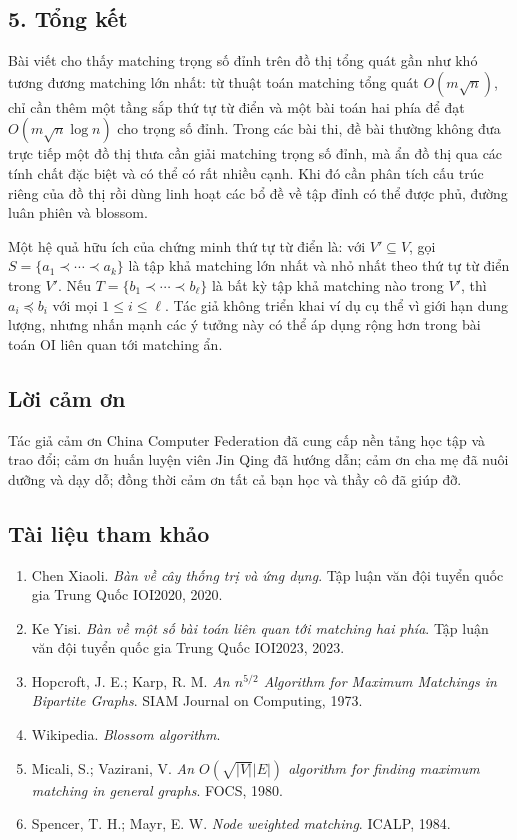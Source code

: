 \documentclass[11pt]{article}
\begin{document}
\subsection*{5. Tổng kết}

Bài viết cho thấy matching trọng số đỉnh trên đồ thị tổng quát gần như khó
tương đương matching lớn nhất: từ thuật toán matching tổng quát
\(O(m\sqrt n)\), chỉ cần thêm một tầng sắp thứ tự từ điển và một bài toán hai
phía để đạt \(O(m\sqrt n\log n)\) cho trọng số đỉnh. Trong các bài thi, đề bài
thường không đưa trực tiếp một đồ thị thưa cần giải matching trọng số đỉnh, mà
ẩn đồ thị qua các tính chất đặc biệt và có thể có rất nhiều cạnh. Khi đó cần
phân tích cấu trúc riêng của đồ thị rồi dùng linh hoạt các bổ đề về tập đỉnh
có thể được phủ, đường luân phiên và blossom.

Một hệ quả hữu ích của chứng minh thứ tự từ điển là: với \(V'\subseteq V\),
gọi \(S=\{a_1\prec\cdots\prec a_k\}\) là tập khả matching lớn nhất và nhỏ nhất
theo thứ tự từ điển trong \(V'\). Nếu \(T=\{b_1\prec\cdots\prec b_\ell\}\) là
bất kỳ tập khả matching nào trong \(V'\), thì \(a_i\preceq b_i\) với mọi
\(1\le i\le \ell\). Tác giả không triển khai ví dụ cụ thể vì giới hạn dung
lượng, nhưng nhấn mạnh các ý tưởng này có thể áp dụng rộng hơn trong bài toán
OI liên quan tới matching ẩn.

\subsection*{Lời cảm ơn}

Tác giả cảm ơn China Computer Federation đã cung cấp nền tảng học tập và trao
đổi; cảm ơn huấn luyện viên Jin Qing đã hướng dẫn; cảm ơn cha mẹ đã nuôi dưỡng
và dạy dỗ; đồng thời cảm ơn tất cả bạn học và thầy cô đã giúp đỡ.

\subsection*{Tài liệu tham khảo}

\begin{enumerate}
  \item Chen Xiaoli. \emph{Bàn về cây thống trị và ứng dụng}. Tập luận văn đội
  tuyển quốc gia Trung Quốc IOI2020, 2020.
  \item Ke Yisi. \emph{Bàn về một số bài toán liên quan tới matching hai phía}.
  Tập luận văn đội tuyển quốc gia Trung Quốc IOI2023, 2023.
  \item Hopcroft, J. E.; Karp, R. M. \emph{An \(n^{5/2}\) Algorithm for Maximum
  Matchings in Bipartite Graphs}. SIAM Journal on Computing, 1973.
  \item Wikipedia. \emph{Blossom algorithm}.
  \item Micali, S.; Vazirani, V. \emph{An \(O(\sqrt{|V|}|E|)\) algorithm for
  finding maximum matching in general graphs}. FOCS, 1980.
  \item Spencer, T. H.; Mayr, E. W. \emph{Node weighted matching}. ICALP, 1984.
\end{enumerate}
\end{document}
